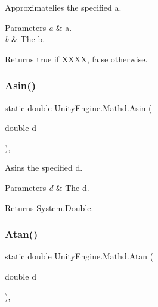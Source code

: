 Approximatelies the specified a. 


\begin{DoxyParams}{Parameters}
{\em a} & a.\\
\hline
{\em b} & The b.\\
\hline
\end{DoxyParams}
\begin{DoxyReturn}{Returns}
{\ttfamily true} if X\+X\+XX, {\ttfamily false} otherwise.
\end{DoxyReturn}
\mbox{\label{struct_unity_engine_1_1_mathd_aaff3160c6d1a2f5009428539684c7e58}} 
\subsubsection{\texorpdfstring{Asin()}{Asin()}}
{\footnotesize\ttfamily static double Unity\+Engine.\+Mathd.\+Asin (\begin{DoxyParamCaption}\item[{double}]{d }\end{DoxyParamCaption})\hspace{0.3cm}{\ttfamily [inline]}, {\ttfamily [static]}}



Asins the specified d. 


\begin{DoxyParams}{Parameters}
{\em d} & The d.\\
\hline
\end{DoxyParams}
\begin{DoxyReturn}{Returns}
System.\+Double.
\end{DoxyReturn}
\mbox{\label{struct_unity_engine_1_1_mathd_a0de7adcaa412bc33e545f449176491a4}} 
\subsubsection{\texorpdfstring{Atan()}{Atan()}}
{\footnotesize\ttfamily static double Unity\+Engine.\+Mathd.\+Atan (\begin{DoxyParamCaption}\item[{double}]{d }\end{DoxyParamCaption})\hspace{0.3cm}{\ttfamily [inline]}, {\ttfamily [static]}}



